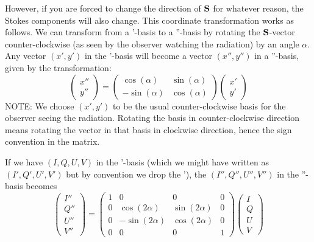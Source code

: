 \documentclass{report}
\begin{document}
However, if you are forced to change the direction of ${\bf S}$ for whatever
reason, the Stokes components will also change. This coordinate transformation
works as follows.
We can transform from a '-basis to a ''-basis by rotating the ${\bf S}$-vector
counter-clockwise (as seen by the observer watching the radiation) by an
angle $\alpha$. Any vector $(x',y')$ in the '-basis will become a vector
$(x'',y'')$ in a ''-basis, given by the transformation:
\begin{equation}
\left(\begin{matrix}
x''\\y''
\end{matrix}\right)
=
\left(\begin{matrix}
\cos(\alpha) & \sin(\alpha)\\
-\sin(\alpha) & \cos(\alpha)
\end{matrix}\right)
\left(\begin{matrix}
x'\\y'
\end{matrix}\right)
\end{equation}
NOTE: We choose $(x',y')$ to be the usual counter-clockwise basis for the
observer seeing the radiation. Rotating the basis in counter-clockwise
direction means rotating the vector in that basis in clockwise direction,
hence the sign convention in the matrix. 

If we have $(I,Q,U,V)$ in the '-basis (which we might have written as
$(I',Q',U',V')$ but by convention we drop the '), the $(I'',Q'',U'',V'')$ in
the ''-basis becomes
\begin{equation}
\left(\begin{matrix}
I''\\Q''\\U''\\V''
\end{matrix}\right)
=
\left(\begin{matrix}
1 & 0 & 0 & 0 \\
0 & \cos(2\alpha) & \sin(2\alpha) & 0 \\
0 & -\sin(2\alpha) & \cos(2\alpha) & 0 \\
0 & 0 & 0 & 1
\end{matrix}\right)
\left(\begin{matrix}
I\\Q\\U\\V
\end{matrix}\right)
\end{equation}
\end{document}
